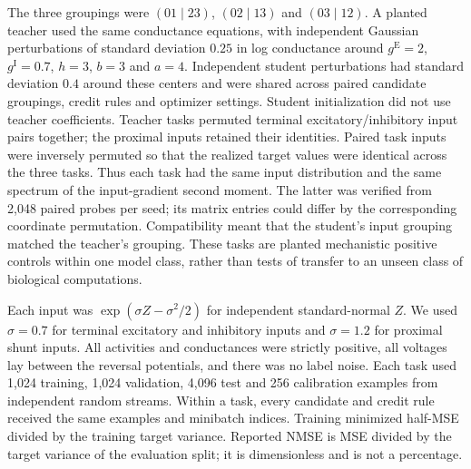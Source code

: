 The three groupings were $(01\mid23)$, $(02\mid13)$ and $(03\mid12)$. A planted teacher used the same conductance equations, with independent Gaussian perturbations of standard deviation $0.25$ in log conductance around $g^{\mathrm E}=2$, $g^{\mathrm I}=0.7$, $h=3$, $b=3$ and $a=4$. Independent student perturbations had standard deviation $0.4$ around these centers and were shared across paired candidate groupings, credit rules and optimizer settings. Student initialization did not use teacher coefficients. Teacher tasks permuted terminal excitatory/inhibitory input pairs together; the proximal inputs retained their identities. Paired task inputs were inversely permuted so that the realized target values were identical across the three tasks. Thus each task had the same input distribution and the same spectrum of the input-gradient second moment. The latter was verified from 2,048 paired probes per seed; its matrix entries could differ by the corresponding coordinate permutation. Compatibility meant that the student's input grouping matched the teacher's grouping. These tasks are planted mechanistic positive controls within one model class, rather than tests of transfer to an unseen class of biological computations.

Each input was $\exp(\sigma Z-\sigma^2/2)$ for independent standard-normal $Z$. We used $\sigma=0.7$ for terminal excitatory and inhibitory inputs and $\sigma=1.2$ for proximal shunt inputs. All activities and conductances were strictly positive, all voltages lay between the reversal potentials, and there was no label noise. Each task used 1,024 training, 1,024 validation, 4,096 test and 256 calibration examples from independent random streams. Within a task, every candidate and credit rule received the same examples and minibatch indices. Training minimized half-MSE divided by the training target variance. Reported NMSE is MSE divided by the target variance of the evaluation split; it is dimensionless and is not a percentage.

